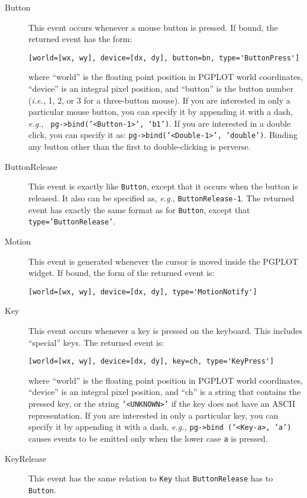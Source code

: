 \begin{description}
\item[Button] This event occurs whenever a mouse button is pressed.
     If bound, the returned event has the form:

\begin{verbatim}
[world=[wx, wy], device=[dx, dy], button=bn, type='ButtonPress']
\end{verbatim}

where ``world'' is the floating point position in PGPLOT world
coordinates, ``device'' is an integral pixel position, and ``button'' is
the button number ({\em i.e.,} 1, 2, or 3 for a three-button mouse).
If you are interested in only a particular mouse button, you can
specify it by appending it with a dash, {\em e.g.,} {\tt
pg->bind('<Button-1>', 'b1')}.  If you are interested in a double
click, you can specify it as: {\tt pg->bind('<Double-1>', 'double')}.
Binding any button other than the first to double-clicking is
perverse.

\item[ButtonRelease] This event is exactly like {\tt Button}, except
     that it occurs when the button is released.  It also can be
     specified as, {\em e.g.}, {\tt ButtonRelease-1}.  The returned
     event has exactly the same format as for {\tt Button}, except
     that {\tt type='ButtonRelease'}.
\item[Motion] This event is generated whenever the cursor is moved
     inside the PGPLOT widget.  If bound, the form of the returned
     event is:

\begin{verbatim}
[world=[wx, wy], device=[dx, dy], type='MotionNotify']
\end{verbatim}

\item[Key] This event occurs whenever a key is pressed on the
     keyboard.  This includes ``special'' keys.  The returned event
     is:

\begin{verbatim}
[world=[wx, wy], device=[dx, dy], key=ch, type='KeyPress']
\end{verbatim}

where ``world'' is the floating point position in PGPLOT world
coordinates, ``device'' is an integral pixel position, and ``ch'' is a
string that contains the pressed key, or the string {\tt '<UNKNOWN>'}
if the key does not have an ASCII representation.  If you are
interested in only a particular key, you can specify it by appending
it with a dash, {\em e.g.,} {\tt pg->bind ('<Key-a>, 'a')} causes
events to be emitted only when the lower case {\tt a} is pressed.

\item[KeyRelease] This event has the same relation to {\tt Key} that
     {\tt ButtonRelease} has to {\tt Button}.
\end{description}

